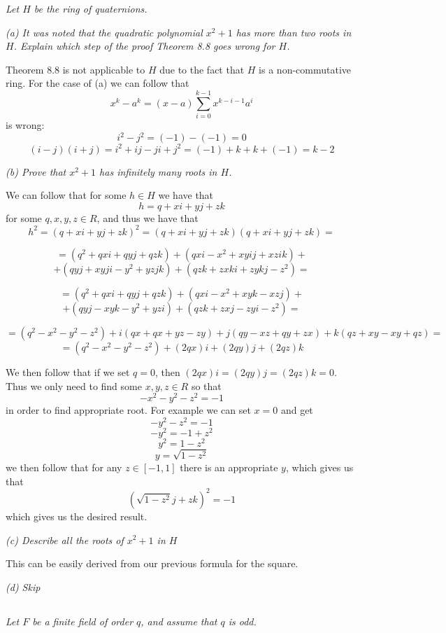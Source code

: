 \documentclass[11pt,oneside,titlepage]{book}
\begin{document}
\textit{Let $H$ be the ring of quaternions.}

\textit{(a) It was noted that the quadratic polynomial $x^2 + 1$ has
  more than two roots in $H$. Explain which step of the proof Theorem
  8.8 goes wrong for $H$.}

Theorem 8.8 is not applicable to $H$ due to the fact that $H$ is a
non-commutative ring. For the case of (a) we can follow that
$$x^k - a^k = (x - a) \sum_{i = 0}^{k - 1}{x^{k - i - 1} a^i }$$
is wrong:
$$i^2 - j^2 = (-1) - (-1) = 0$$
$$(i - j)(i + j) = i^2 + ij - ji + j^2 = (-1) + k + k + (-1) = k - 2$$

\textit{(b) Prove that $x^2 + 1$ has infinitely many roots in $H$.}

We can follow that for some $h \in H$ we have that
$$h = q + xi + yj + zk$$
for some $q, x, y, z \in R$, and thus we have that 
$$h^2 = (q + xi + yj + zk)^2 = (q + xi + yj + zk)(q + xi + yj + zk) = $$

$$= (q^2 + qxi+ qyj + qzk) + (qxi - x^2 + xyij + xzik) + $$
$$+ (qyj + xyji - y^2 + yzjk) + (qzk + zxki + zykj - z^2) = $$

$$= (q^2 + qxi+ qyj + qzk) + (qxi - x^2 + xyk - xzj) + $$
$$+ (qyj - xyk - y^2 + yzi) + (qzk + zxj - zyi - z^2) = $$

$$= (q^2 - x^2 - y^2 - z^2) + i(qx + qx + yz - zy) +
j(qy - xz + qy + zx) + k(qz + xy - xy + qz) = $$
$$= (q^2 - x^2 - y^2 - z^2) + (2qx) i + (2qy) j + (2qz) k$$

We then follow that if we set $q = 0$, then $(2qx) i = (2qy) j = (2qz) k = 0$.
Thus we only need to find some $x, y, z \in R$ so that
$$- x^2 - y^2 - z^2 = -1$$
in order to find appropriate root. For example we can set $x = 0$ and get
$$- y^2 - z^2 = -1$$
$$- y^2  = -1 + z^2$$
$$y^2  = 1 - z^2$$
$$y  = \sqrt{1 - z^2}$$
we then follow that for any $z \in [-1, 1]$ there  is an appropriate $y$, which
gives us that
$$(\sqrt{1 - z^2} j + zk)^2 = -1$$
which gives us the desired result.

\textit{(c) Describe all the roots of $x^2 + 1$ in $H$}

This can be easily derived from our previous formula for the square.

\textit{(d) Skip}

\subsection{}

\textit{Let $F$ be a finite field of order $q$, and assume that $q$ is
  odd.}
\end{document}
